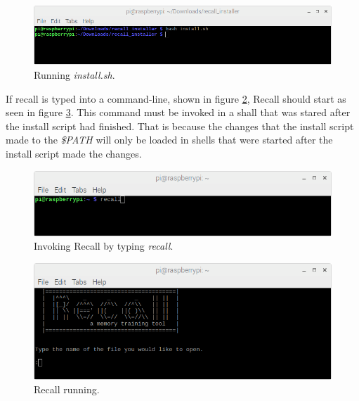 \documentclass[letterpaper]{article}
\begin{document}
\begin{figure}[H]
  \centering
  \includegraphics[width=14cm]{images/command_line_install/run_install_script.png}
  \caption{Running \textit{install.sh}.}
  \label{fig:run_bash_install}
\end{figure}

  If recall is typed into a command-line, shown in figure \ref{fig:invoke_recall_command}, Recall should start as seen in figure \ref{fig:recall_first_invoked}. This command must be invoked in a shall that was stared after the install script had finished. That is because the changes that the install script made to the \textit{\$PATH} will only be loaded in shells that were started after the install script made the changes.

  \begin{figure}[H]
    \centering
    \includegraphics[width=14cm]{images/command_line_install/recall_command.png}
    \caption{Invoking Recall by typing \textit{recall}.}
    \label{fig:invoke_recall_command}
  \end{figure}

  \begin{figure}[H]
    \centering
    \includegraphics[width=14cm]{images/command_line_install/recall_running.png}
    \caption{Recall running.}
    \label{fig:recall_first_invoked}
  \end{figure}
\end{document}
